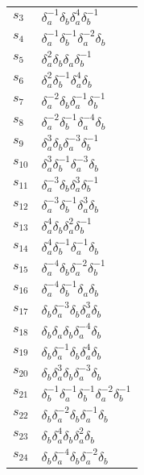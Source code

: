 \documentclass{article}
\begin{document}
\begin{center}
\begin{tabular}{ll}
$s_{3}$ & $\delta_a^{-1}\delta_b^{}\delta_a^{4}\delta_b^{-1}$ \\
$s_{4}$ & $\delta_a^{-1}\delta_b^{-1}\delta_a^{-2}\delta_b^{}$ \\
$s_{5}$ & $\delta_a^{2}\delta_b^{}\delta_a^{}\delta_b^{-1}$ \\
$s_{6}$ & $\delta_a^{2}\delta_b^{-1}\delta_a^{4}\delta_b^{}$ \\
$s_{7}$ & $\delta_a^{-2}\delta_b^{}\delta_a^{-1}\delta_b^{-1}$ \\
$s_{8}$ & $\delta_a^{-2}\delta_b^{-1}\delta_a^{-4}\delta_b^{}$ \\
$s_{9}$ & $\delta_a^{3}\delta_b^{}\delta_a^{-3}\delta_b^{-1}$ \\
$s_{10}$ & $\delta_a^{3}\delta_b^{-1}\delta_a^{-3}\delta_b^{}$ \\
$s_{11}$ & $\delta_a^{-3}\delta_b^{}\delta_a^{3}\delta_b^{-1}$ \\
$s_{12}$ & $\delta_a^{-3}\delta_b^{-1}\delta_a^{3}\delta_b^{}$ \\
$s_{13}$ & $\delta_a^{4}\delta_b^{}\delta_a^{2}\delta_b^{-1}$ \\
$s_{14}$ & $\delta_a^{4}\delta_b^{-1}\delta_a^{-1}\delta_b^{}$ \\
$s_{15}$ & $\delta_a^{-4}\delta_b^{}\delta_a^{-2}\delta_b^{-1}$ \\
$s_{16}$ & $\delta_a^{-4}\delta_b^{-1}\delta_a^{}\delta_b^{}$ \\
$s_{17}$ & $\delta_b^{}\delta_a^{-3}\delta_b^{}\delta_a^{3}\delta_b^{}$ \\
$s_{18}$ & $\delta_b^{}\delta_a^{}\delta_b^{}\delta_a^{-4}\delta_b^{}$ \\
$s_{19}$ & $\delta_b^{}\delta_a^{-1}\delta_b^{}\delta_a^{4}\delta_b^{}$ \\
$s_{20}$ & $\delta_b^{}\delta_a^{3}\delta_b^{}\delta_a^{-3}\delta_b^{}$ \\
$s_{21}$ & $\delta_b^{-1}\delta_a^{-1}\delta_b^{-1}\delta_a^{-2}\delta_b^{-1}$ 
\\
$s_{22}$ & $\delta_b^{}\delta_a^{-2}\delta_b^{}\delta_a^{-1}\delta_b^{}$ \\
$s_{23}$ & $\delta_b^{}\delta_a^{4}\delta_b^{}\delta_a^{2}\delta_b^{}$ \\
$s_{24}$ & $\delta_b^{}\delta_a^{-4}\delta_b^{}\delta_a^{-2}\delta_b^{}$ \\
\bottomrule
\end{tabular}
\end{center}

\thispagestyle{empty}
\end{document}
